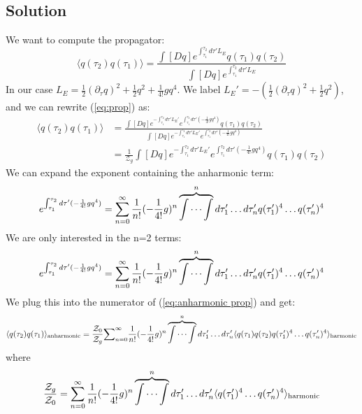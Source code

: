 \documentclass{article}
\begin{document}
\subsection*{Solution}
We want to compute the propagator:\\
\begin{equation} \label{eq:prop}
    \langle q(\tau_2)q(\tau_1)\rangle=\frac{\int [Dq]e^{\int_{\tau_1}^{\tau_2}d\tau'L_E}q(\tau_1)q(\tau_2)}{\int [Dq]e^{\int_{\tau_1}^{\tau_2}d\tau'L_E}}
\end{equation}
In our case $L_E=\frac{1}{2}(\partial_\tau q)^2+\frac{1}{2}q^2+\frac{1}{4!}gq^4$. We label $L_E'=-(\frac{1}{2}(\partial_\tau q)^2+\frac{1}{2}q^2)$, and we can rewrite (\ref{eq:prop}) as:
\begin{equation} 
\begin{split}
    \langle q(\tau_2)q(\tau_1)\rangle & 
    =\frac{\int [Dq]e^{-\int_{\tau_1}^{\tau_2}d\tau'L_E'}e^{\int_{\tau_1}^{\tau_2}d\tau' (-\frac{1}{4!}gq^4)}q(\tau_1)q(\tau_2)}{\int [Dq]e^{-\int_{\tau_1}^{\tau_2}d\tau'L_E'}e^{\int_{\tau_1}^{\tau_2}d\tau' (-\frac{1}{4!}gq^4)}}\\
    &=\frac{1}{\mathcal{Z}_g}\int [Dq]e^{-\int_{\tau_1}^{\tau_2}d\tau'L_E'}e^{\int_{\tau_1}^{\tau_2}d\tau' (-\frac{1}{4!}gq^4)}q(\tau_1)q(\tau_2)
\end{split}
\end{equation}
We can expand the exponent containing the anharmonic term: 
\begin{equation*}
    e^{\int_{\tau_1}^{\tau_2}d\tau' (-\frac{1}{4!}gq^4)}=
    \sum_{n=0}^{\infty}\frac{1}{n!}(-\frac{1}{4!}g)^n\overbrace{\idotsint}^n d\tau_1'\dots d\tau_n' q(\tau_1')^4\dots q(\tau_n')^4
\end{equation*}
We are only interested in the n=2 terms:
\begin{equation*}
    e^{\int_{\tau_1}^{\tau_2}d\tau' (-\frac{1}{4!}gq^4)}=
    \sum_{n=0}^{\infty}\frac{1}{n!}(-\frac{1}{4!}g)^n\overbrace{\idotsint}^n d\tau_1'\dots d\tau_n' q(\tau_1')^4\dots q(\tau_n')^4
\end{equation*}
We plug this into the numerator of (\ref{eq:anharmonic prop}) and get:
\begin{equation*}
   \langle q(\tau_2)q(\tau_1) \rangle_{\text{anharmonic}} = \frac{\mathcal{Z}_0}{\mathcal{Z}_g}\mathcal  \sum_{n=0}^{\infty}\frac{1}{n!}(-\frac{1}{4!}g)^n\overbrace{\idotsint}^n d\tau_1'\dots d\tau_n' \langle q(\tau_1)q(\tau_2) q(\tau_1')^4\dots q(\tau_n')^4\rangle_{\text{harmonic}} 
\end{equation*}
where
\begin{equation*}
   \frac{\mathcal{Z}_g}{\mathcal{Z}_0} = \sum_{n=0}^{\infty}\frac{1}{n!}(-\frac{1}{4!}g)^n\overbrace{\idotsint}^n d\tau_1'\dots d\tau_n' \langle  q(\tau_1')^4\dots q(\tau_n')^4\rangle_{\text{harmonic}} 
\end{equation*}
\end{document}
